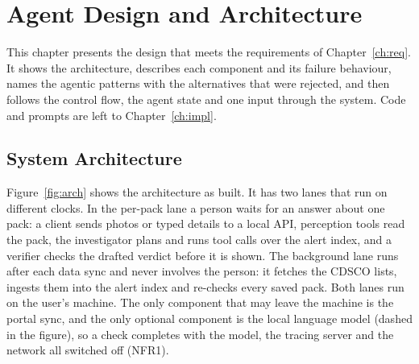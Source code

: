 \chapter{Agent Design and Architecture}
\label{ch:design}

This chapter presents the design that meets the requirements of Chapter~\ref{ch:req}. It shows
the architecture, describes each component and its failure behaviour, names the agentic patterns
with the alternatives that were rejected, and then follows the control flow, the agent state and
one input through the system. Code and prompts are left to Chapter~\ref{ch:impl}.

\section{System Architecture}
\label{sec:design-system-architecture}

Figure~\ref{fig:arch} shows the architecture as built. It has two lanes that run on different
clocks. In the per-pack lane a person waits for an answer about one pack: a client sends photos
or typed details to a local API, perception tools read the pack, the investigator plans and runs
tool calls over the alert index, and a verifier checks the drafted verdict before it is shown. The
background lane runs after each data sync and never involves the person: it fetches the CDSCO lists,
ingests them into the alert index and re-checks every saved pack. Both lanes run on the user's
machine. The only component that may leave the machine is the portal sync, and the only optional
component is the local language model (dashed in the figure), so a check completes with the model,
the tracing server and the network all switched off (NFR1).

